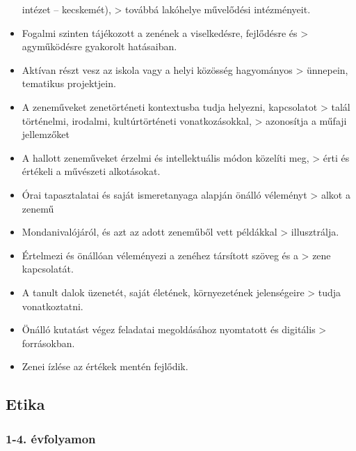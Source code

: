 \begin{itemize}
  intézet -- kecskemét), \textgreater{} továbbá lakóhelye művelődési
  intézményeit.
\item
  Fogalmi szinten tájékozott a zenének a viselkedésre, fejlődésre és
  \textgreater{} agyműködésre gyakorolt hatásaiban.
\item
  Aktívan részt vesz az iskola vagy a helyi közösség hagyományos
  \textgreater{} ünnepein, tematikus projektjein.
\item
  A zeneműveket zenetörténeti kontextusba tudja helyezni, kapcsolatot
  \textgreater{} talál történelmi, irodalmi, kultúrtörténeti
  vonatkozásokkal, \textgreater{} azonosítja a műfaji jellemzőket
\item
  A hallott zeneműveket érzelmi és intellektuális módon közelíti meg,
  \textgreater{} érti és értékeli a művészeti alkotásokat.
\item
  Órai tapasztalatai és saját ismeretanyaga alapján önálló véleményt
  \textgreater{} alkot a zenemű
\item
  Mondanivalójáról, és azt az adott zeneműből vett példákkal
  \textgreater{} illusztrálja.
\item
  Értelmezi és önállóan véleményezi a zenéhez társított szöveg és a
  \textgreater{} zene kapcsolatát.
\item
  A tanult dalok üzenetét, saját életének, környezetének jelenségeire
  \textgreater{} tudja vonatkoztatni.
\item
  Önálló kutatást végez feladatai megoldásához nyomtatott és digitális
  \textgreater{} forrásokban.
\item
  Zenei ízlése az értékek mentén fejlődik.
\end{itemize}

\hypertarget{etika}{%
\subsection{Etika}\label{etika}}

\hypertarget{evfolyamon-14}{%
\subsubsection{1-4. évfolyamon}\label{evfolyamon-14}}

